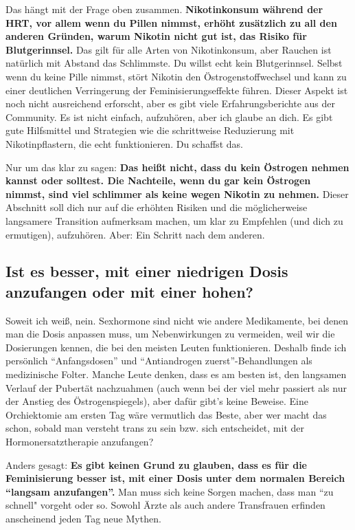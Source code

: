 \documentclass{article}
\begin{document}
{{{Das hängt mit der Frage oben zusammen. \textbf{Nikotinkonsum während der HRT, vor allem wenn du Pillen nimmst, erhöht zusätzlich zu all den anderen Gründen, warum Nikotin nicht gut ist, das Risiko für Blutgerinnsel.} Das gilt für alle Arten von Nikotinkonsum, aber Rauchen ist natürlich mit Abstand das Schlimmste. Du willst echt kein Blutgerinnsel. Selbst wenn du keine Pille nimmst, stört Nikotin den Östrogenstoffwechsel und kann zu einer deutlichen Verringerung der Feminisierungseffekte führen. Dieser Aspekt ist noch nicht ausreichend erforscht, aber es gibt viele Erfahrungsberichte aus der Community. Es ist nicht einfach, aufzuhören, aber ich glaube an dich. Es gibt gute Hilfsmittel und Strategien wie die schrittweise Reduzierung mit Nikotinpflastern, die echt funktionieren. Du schaffst das.

Nur um das klar zu sagen: \textbf{Das heißt nicht, dass du kein Östrogen nehmen kannst oder solltest. Die Nachteile, wenn du gar kein Östrogen nimmst, sind viel schlimmer als keine wegen Nikotin zu nehmen.} Dieser Abschnitt soll dich nur auf die erhöhten Risiken und die möglicherweise langsamere Transition aufmerksam machen, um klar zu Empfehlen (und dich zu ermutigen), aufzuhören. Aber: Ein Schritt nach dem anderen.

\subsection{Ist es besser, mit einer niedrigen Dosis anzufangen oder mit einer hohen?}

Soweit ich weiß, nein. Sexhormone sind nicht wie andere Medikamente, bei denen man die Dosis anpassen muss, um Nebenwirkungen zu vermeiden, weil wir die Dosierungen kennen, die bei den meisten Leuten funktionieren. Deshalb finde ich persönlich “Anfangsdosen” und “Antiandrogen zuerst”-Behandlungen als medizinische Folter. Manche Leute denken, dass es am besten ist, den langsamen Verlauf der Pubertät nachzuahmen (auch wenn bei der viel mehr passiert als nur der Anstieg des Östrogenspiegels), aber dafür gibt's keine Beweise. Eine Orchiektomie am ersten Tag wäre vermutlich das Beste, aber wer macht das schon, sobald man versteht trans zu sein bzw. sich entscheidet, mit der Hormonersatztherapie anzufangen?

Anders gesagt: \textbf{Es gibt keinen Grund zu glauben, dass es für die Feminisierung besser ist, mit einer Dosis unter dem normalen Bereich “langsam anzufangen”.} Man muss sich keine Sorgen machen, dass man “zu schnell" vorgeht oder so. Sowohl Ärzte als auch andere Transfrauen erfinden anscheinend jeden Tag neue Mythen.

}}}
\end{document}
